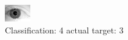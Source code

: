 \begin{figure}[h!]
\begin{center}
\includegraphics[width=0.60\columnwidth]{figures/ID2123_class_4_target_3.png}
\end{center}
\caption{ Classification: 4 actual target: 3}
\label{fig:ID2123_class_4_target_3}
\end{figure}
